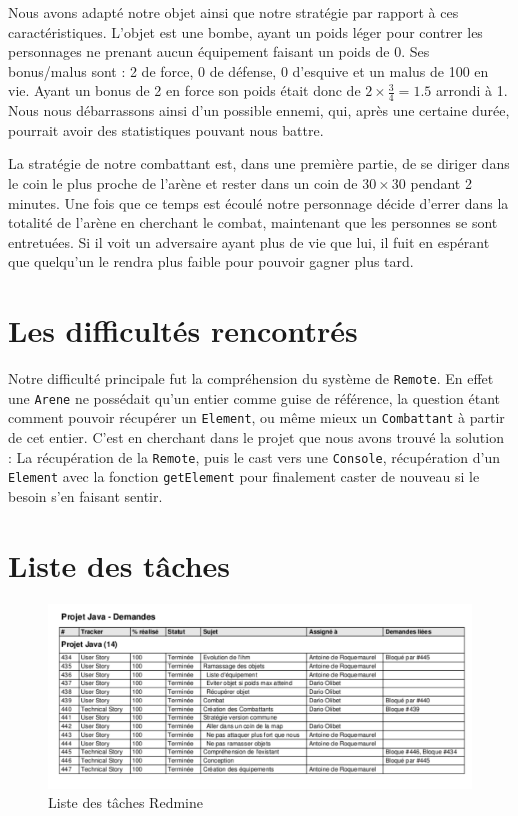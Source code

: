 \documentclass[12pt,a4paper,openany]{book}
\let\pagebreakORIG\pagebreak
\let\clearpageORIG\clearpage
\let\cleardoublepageORIG\cleardoublepage
\newcommand{\removepagebreak}{\renewcommand{\pagebreak}{}\renewcommand{\clearpage}{}\renewcommand{\cleardoublepage}{}}
\newcommand{\restorepagebreak}{\renewcommand{\pagebreak}{\pagebreakORIG}\renewcommand{\clearpage}{\clearpageORIG}\renewcommand{\cleardoublepage}{\cleardoublepageORIG}}
\begin{document}
Nous avons adapté notre objet ainsi que notre stratégie par rapport à ces caractéristiques. L'objet est une bombe, ayant un poids léger pour
contrer les personnages ne prenant aucun équipement faisant un poids de 0. Ses bonus/malus sont : 2 de force, 0 de défense, 0 d'esquive et un malus de
100 en vie. Ayant un bonus de 2 en force son poids était donc de $2 \times \frac{3}{4} = 1.5$ arrondi à 1. Nous nous débarrassons ainsi d’un possible ennemi, qui, après une certaine
durée, pourrait avoir des statistiques pouvant nous battre. 

La stratégie de notre combattant est, dans une première partie, de se diriger dans le coin le plus
proche de l'arène et rester dans un coin de $30\times 30$ pendant 2 minutes. Une fois que ce temps est écoulé notre personnage décide d'errer dans la totalité de
l'arène en cherchant le combat, maintenant que les personnes se sont entretuées. Si il voit un adversaire ayant plus de vie que lui, il fuit en espérant que
quelqu'un le rendra plus faible pour pouvoir gagner plus tard.

\chapter{Les difficultés rencontrés}
		Notre difficulté principale fut la compréhension du système de \texttt{Remote}. En effet une \texttt{Arene} ne possédait qu'un
		entier comme guise de référence, la question étant comment pouvoir récupérer un \texttt{Element}, ou même mieux un \texttt{Combattant} à partir de cet
		entier. C'est en cherchant dans le projet que nous avons trouvé la solution : La récupération de la \texttt{Remote}, puis le cast vers une \texttt{Console}, récupération d'un
		\texttt{Element} avec la fonction \texttt{getElement} pour finalement caster de nouveau si le besoin s'en faisant sentir.

\appendix
	\chapter{Liste des tâches}
\removepagebreak
	\begin{figure}[H]
		\centering
		\includegraphics[width=14cm]{tachesRedmine.pdf}
		\caption{Liste des tâches Redmine}
	\end{figure}
\listoffigures
	\vfill
	\vfill
\listoftables
	\vfill
	\restorepagebreak
	
\end{document}
